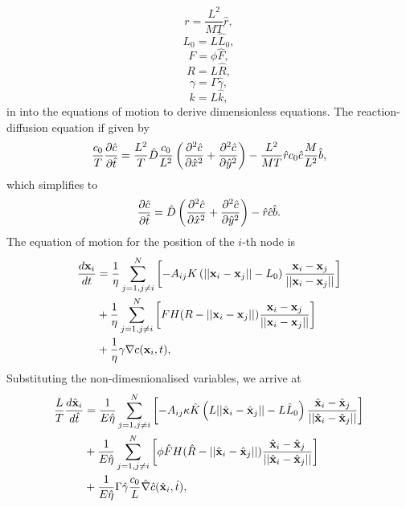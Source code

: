 \begin{equation*}
    r = \frac{L^2}{M T} \hat{r},
\end{equation*}
\begin{equation*}
    L_0 = L \hat{L}_0,
\end{equation*}
\begin{equation*}
    F = \phi \hat{F},
\end{equation*}
\begin{equation*}
    R = L \hat{R},
\end{equation*}
\begin{equation*}
    \gamma = \Gamma \hat{\gamma},
\end{equation*}
\begin{equation*}
    k = L \hat{k},
\end{equation*}in
into the equations of motion to derive dimensionless equations. The reaction-diffusion equation 
if given by 
\begin{equation*}
    \frac{c_0}{T}\pdv{\hat{c}}{\hat{t}} = \frac{L^2}{T} \hat{D} \frac{c_0}{L^2} \left(\pdv[2]{\hat{c}}{\hat{x}} + \pdv[2]{\hat{c}}{\hat{y}} \right) -
     \frac{L^2}{M T} \hat{r} c_0 \hat{c} \frac{M}{L^2} \hat{b},
\end{equation*}
which simplifies to 
\begin{equation*}
    \pdv{\hat{c}}{\hat{t}} =  \hat{D} \left(\pdv[2]{\hat{c}}{\hat{x}} + \pdv[2]{\hat{c}}{\hat{y}} \right) -
      \hat{r} \hat{c} \hat{b}.
\end{equation*}
The equation of motion for the position of the $i$-th node is 
\begin{equation*}
\begin{split}
    \frac{d \vb{x}_i}{dt} &= 
    \frac{1}{ \eta}\sum_{j = 1, j \neq i}^N   \left[ - A_{ij} K\left( ||\vb{x}_i - \vb{x}_j|| - L_0\right) \frac{\vb{x}_i - \vb{x}_j}{||\vb{x}_i - \vb{x}_j||} \right]\\
     &+ \frac{1}{ \eta}\sum_{j = 1, j \neq i}^N \left[F H(R - ||\vb{x}_i - \vb{x}_j||) \frac{\vb{x}_i - \vb{x}_j}{||\vb{x}_i - \vb{x}_j||}     \right]\\ 
     &+ \frac{1}{\eta} \gamma \nabla c (\vb{x}_i, t),
\end{split}
\end{equation*}
Substituting the non-dimesnionalised variables, we arrive at
\begin{equation*}
    \begin{split}
        \frac{L}{T}\frac{d \hat{\vb{x}}_i}{d \hat{t}} &= 
        \frac{1}{E  \hat{\eta}}\sum_{j = 1, j \neq i}^N   \left[ - A_{ij} \kappa \hat{K}\left( L||\hat{\vb{x}}_i - \hat{\vb{x}}_j|| - L \hat{L}_0\right) \frac{\hat{\vb{x}}_i - \hat{\vb{x}}_j}{||\hat{\vb{x}}_i - \hat{\vb{x}}_j||} \right]\\
         &+ \frac{1}{E  \hat{\eta}}\sum_{j = 1, j \neq i}^N \left[\phi\hat{F} H(\hat{R} - ||\hat{\vb{x}}_i - \hat{\vb{x}}_j||) \frac{\hat{\vb{x}}_i - \hat{\vb{x}}_j}{||\hat{\vb{x}}_i - \hat{\vb{x}}_j||}     \right]\\ 
         &+ \frac{1}{E  \hat{\eta}}\Gamma \hat{\gamma} \frac{c_0}{L} \hat{\nabla}  \hat{c} (\hat{\vb{x}}_i, \hat{t}),
    \end{split}
\end{equation*}
